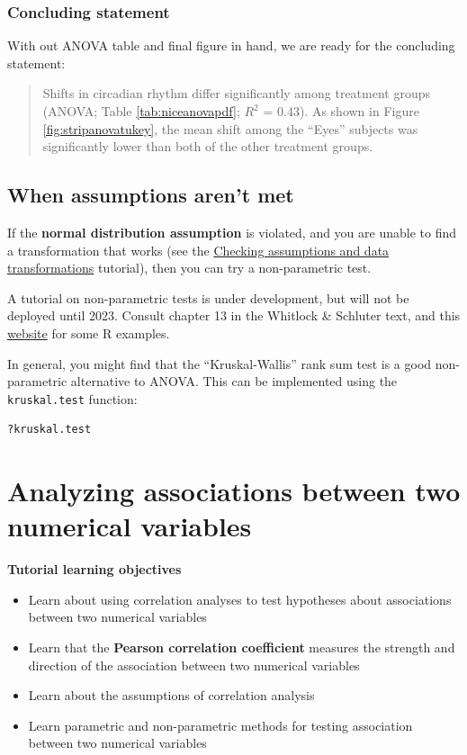 \documentclass[
]{book}
\providecommand{\tightlist}{%
  \setlength{\itemsep}{0pt}\setlength{\parskip}{0pt}}
\begin{document}
\subsection{Concluding statement}\label{anova_conclusion}

With out ANOVA table and final figure in hand, we are ready for the concluding statement:

\begin{quote}
Shifts in circadian rhythm differ significantly among treatment groups (ANOVA; Table \ref{tab:niceanovapdf}; \(R^2\) = 0.43). As shown in Figure \ref{fig:stripanovatukey}, the mean shift among the ``Eyes'' subjects was significantly lower than both of the other treatment groups.
\end{quote}

\section{When assumptions aren't met}\label{assumpbad_anova}

If the \textbf{normal distribution assumption} is violated, and you are unable to find a transformation that works (see the \href{https://ubco-biology.github.io/BIOL202/checking-assumptions-and-data-transformations.html}{Checking assumptions and data transformations} tutorial), then you can try a non-parametric test.

A tutorial on non-parametric tests is under development, but will not be deployed until 2023. Consult chapter 13 in the Whitlock \& Schluter text, and this \href{https://whitlockschluter3e.zoology.ubc.ca/RExamples/Rcode_Chapter_13.html\#new_methods_on_this_page}{website} for some R examples.

In general, you might find that the ``Kruskal-Wallis'' rank sum test is a good non-parametric alternative to ANOVA. This can be implemented using the \texttt{kruskal.test} function:

\begin{verbatim}
?kruskal.test
\end{verbatim}

\chapter{Analyzing associations between two numerical variables}\label{two_num}

\textbf{Tutorial learning objectives}

\begin{itemize}
\tightlist
\item
  Learn about using correlation analyses to test hypotheses about associations between two numerical variables\\
\item
  Learn that the \textbf{Pearson correlation coefficient} measures the strength and direction of the association between two numerical variables
\item
  Learn about the assumptions of correlation analysis\\
\item
  Learn parametric and non-parametric methods for testing association between two numerical variables
\end{itemize}
\end{document}
